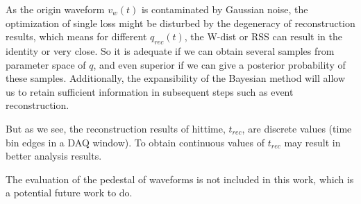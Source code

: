 
As the origin waveform $v_{w}(t)$ is contaminated by Gaussian noise, the optimization of single loss might be disturbed by the degeneracy of reconstruction results, which means for different $q_{rec}(t)$, the W-dist or RSS can result in the identity or very close. So it is adequate if we can obtain several samples from parameter space of $q$, and even superior if we can give a posterior probability of these samples. Additionally, the expansibility of the Bayesian method will allow us to retain sufficient information in subsequent steps such as event reconstruction. 


But as we see, the reconstruction results of hittime, $t_{rec}$, are discrete values (time bin edges in a DAQ window). To obtain continuous values of $t_{rec}$ may result in better analysis results. 


The evaluation of the pedestal of waveforms is not included in this work, which is a potential future work to do. 

